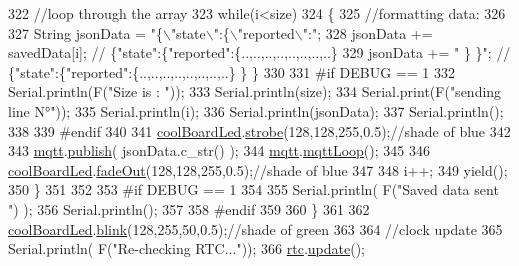 \begin{DoxyCode}
322         \textcolor{comment}{//loop through the array}
323         \textcolor{keywordflow}{while}(i<size)
324         \{
325             \textcolor{comment}{//formatting data:}
326         
327             String jsonData = \textcolor{stringliteral}{"\{\(\backslash\)"state\(\backslash\)":\{\(\backslash\)"reported\(\backslash\)":"};
328             jsonData += savedData[i]; \textcolor{comment}{// \{"state":\{"reported":\{..,..,..,..,..,..,..,..\}}
329             jsonData += \textcolor{stringliteral}{" \} \}"}; \textcolor{comment}{// \{"state":\{"reported":\{..,..,..,..,..,..,..,..\}  \} \}}
330 
331 \textcolor{preprocessor}{        #if DEBUG == 1 }
332             Serial.println(F(\textcolor{stringliteral}{"Size is : "}));
333             Serial.println(size);
334             Serial.print(F(\textcolor{stringliteral}{"sending line N°"}));
335             Serial.println(i);
336             Serial.println(jsonData);
337             Serial.println();
338 
339 \textcolor{preprocessor}{        #endif}
340 
341             \hyperlink{class_cool_board_a1b1d3c684a5baa56b08486e192fd8e97}{coolBoardLed}.\hyperlink{class_cool_board_led_ad5f0de4c628cbfbf49896042831c64ad}{strobe}(128,128,255,0.5);\textcolor{comment}{//shade of blue}
342         
343             \hyperlink{class_cool_board_a2399f44d7c23c1149a335cb3b46d90f1}{mqtt}.\hyperlink{class_cool_m_q_t_t_ace977b3e90ab14b1199fe5c4fb0a13ec}{publish}( jsonData.c\_str() );
344             \hyperlink{class_cool_board_a2399f44d7c23c1149a335cb3b46d90f1}{mqtt}.\hyperlink{class_cool_m_q_t_t_aa5eaae967b562b62cbcf2b8d81f6e5d5}{mqttLoop}();
345         
346             \hyperlink{class_cool_board_a1b1d3c684a5baa56b08486e192fd8e97}{coolBoardLed}.\hyperlink{class_cool_board_led_a93d545679237e8cc858324367149775c}{fadeOut}(128,128,255,0.5);\textcolor{comment}{//shade of blue}
347             
348             i++;
349             yield();
350         \}       
351 
352 
353 \textcolor{preprocessor}{    #if DEBUG == 1}
354 
355         Serial.println( F(\textcolor{stringliteral}{"Saved data sent "}) );
356         Serial.println();
357     
358 \textcolor{preprocessor}{    #endif}
359 
360     \}
361 
362     \hyperlink{class_cool_board_a1b1d3c684a5baa56b08486e192fd8e97}{coolBoardLed}.\hyperlink{class_cool_board_led_a96e1ea13003eee34c9dbcef340404426}{blink}(128,255,50,0.5);\textcolor{comment}{//shade of green}
363 
364     \textcolor{comment}{//clock update}
365     Serial.println( F(\textcolor{stringliteral}{"Re-checking RTC..."}));
366     \hyperlink{class_cool_board_a50d2a6716879d64a85f3c6b44ad63275}{rtc}.\hyperlink{class_cool_time_aae601f795452cfa48d9fb337aed483a8}{update}();

\end{DoxyCode}
